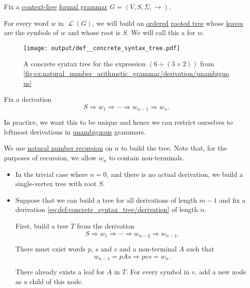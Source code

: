 \begin{definition}\label{def:concrete_syntax_tree}\mimprovised
  Fix a \hyperref[def:chomsky_hierarchy/context_free]{context-free} \hyperref[def:formal_grammar]{formal grammar} \( G = (V, S, \Sigma, \to) \).

  For every word \( w \) in \( \mscrL(G) \), we will build an \hyperref[def:ordered_arborescence]{ordered} \hyperref[def:arborescence/undirected]{rooted tree} whose \hyperref[def:arborescence/ancestry]{leaves} are the symbols of \( w \) and whose root is \( S \). We will call this a  for \( w \).

  \begin{figure}[!ht]
    \hfill
    \texttt{[image: output/def\_\_concrete\_syntax\_tree.pdf]}
    \hfill\hfill
    \caption{A concrete syntax tree for the expression \( (6 \div (3 \times 2)) \) from \cref{fig:ex:natural_number_arithmetic_grammar/derivation/unambiguous}}
    \label{fig:def:concrete_syntax_tree}
  \end{figure}

  Fix a derivation
  \begin{equation}\label{eq:def:concrete_syntax_tree/derivation}
    S \Rightarrow w_1 \Rightarrow \cdots \Rightarrow w_{n-1} \Rightarrow w_n.
  \end{equation}

  In practice, we want this to be unique and hence we can restrict ourselves to leftmost derivations in \hyperref[def:chomsky_hierarchy/context_free]{unambiguous} grammars.

  We use \hyperref[rem:natural_number_recursion]{natural number recursion} on \( n \) to build the tree. Note that, for the purposes of recursion, we allow \( w_n \) to contain non-terminals.

  \begin{itemize}
    \item In the trivial case where \( n = 0 \), and there is no actual derivation, we build a single-vertex tree with root \( S \).

    \item Suppose that we can build a tree for all derivations of length \( m - 1 \) and fix a derivation \eqref{eq:def:concrete_syntax_tree/derivation} of length \( n \).

    First, build a tree \( T \) from the derivation
    \begin{equation*}
      S \Rightarrow w_1 \Rightarrow \cdots \Rightarrow w_{n-2} \Rightarrow w_{n-1}.
    \end{equation*}

    There must exist words \( p \), \( s \) and \( v \) and a non-terminal \( A \) such that
    \begin{equation*}
      w_{n-1} = pAs \Rightarrow pvs = w_n.
    \end{equation*}

    There already exists a leaf for \( A \) in \( T \). For every symbol in \( v \), add a new node as a child of this node.
  \end{itemize}
\end{definition}

